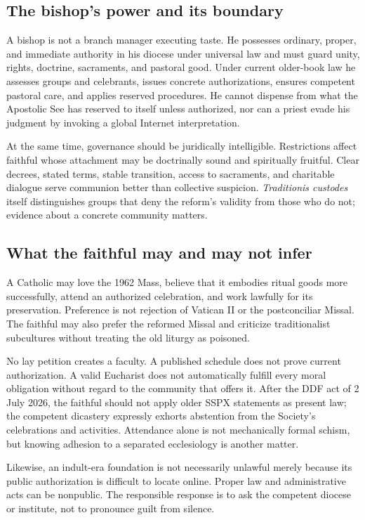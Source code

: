 \subsection{The bishop's power and its boundary}

A bishop is not a branch manager executing taste. He possesses ordinary, proper, and immediate authority in his diocese under universal law and must guard unity, rights, doctrine, sacraments, and pastoral good. Under current older-book law he assesses groups and celebrants, issues concrete authorizations, ensures competent pastoral care, and applies reserved procedures. He cannot dispense from what the Apostolic See has reserved to itself unless authorized, nor can a priest evade his judgment by invoking a global Internet interpretation.

At the same time, governance should be juridically intelligible. Restrictions affect faithful whose attachment may be doctrinally sound and spiritually fruitful. Clear decrees, stated terms, stable transition, access to sacraments, and charitable dialogue serve communion better than collective suspicion. \emph{Traditionis custodes} itself distinguishes groups that deny the reform's validity from those who do not; evidence about a concrete community matters.

\subsection{What the faithful may and may not infer}

A Catholic may love the 1962 Mass, believe that it embodies ritual goods more successfully, attend an authorized celebration, and work lawfully for its preservation. Preference is not rejection of Vatican II or the postconciliar Missal. The faithful may also prefer the reformed Missal and criticize traditionalist subcultures without treating the old liturgy as poisoned.

No lay petition creates a faculty. A published schedule does not prove current authorization. A valid Eucharist does not automatically fulfill every moral obligation without regard to the community that offers it. After the DDF act of 2 July 2026, the faithful should not apply older SSPX statements as present law; the competent dicastery expressly exhorts abstention from the Society's celebrations and activities. Attendance alone is not mechanically formal schism, but knowing adhesion to a separated ecclesiology is another matter.

Likewise, an indult-era foundation is not necessarily unlawful merely because its public authorization is difficult to locate online. Proper law and administrative acts can be nonpublic. The responsible response is to ask the competent diocese or institute, not to pronounce guilt from silence.

